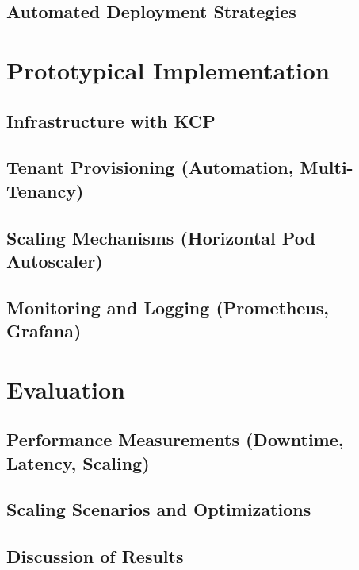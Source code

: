 \documentclass[11pt, a4paper, oneside, draft]{scrartcl}
\begin{document}
        \subsection{Automated Deployment Strategies}

    \section{Prototypical Implementation}

        \subsection{Infrastructure with KCP}

        \subsection[Tenant Provisioning]{Tenant Provisioning (Automation, Multi-Tenancy)}

        \subsection[Scaling Mechanisms]{Scaling Mechanisms (Horizontal Pod Autoscaler)}

        \subsection[Monitoring and Logging]{Monitoring and Logging (Prometheus, Grafana)}

    \section{Evaluation}

        \subsection[Performance Measurements]{Performance Measurements (Downtime, Latency, Scaling)}

        \subsection{Scaling Scenarios and Optimizations}

        \subsection{Discussion of Results}
\end{document}
